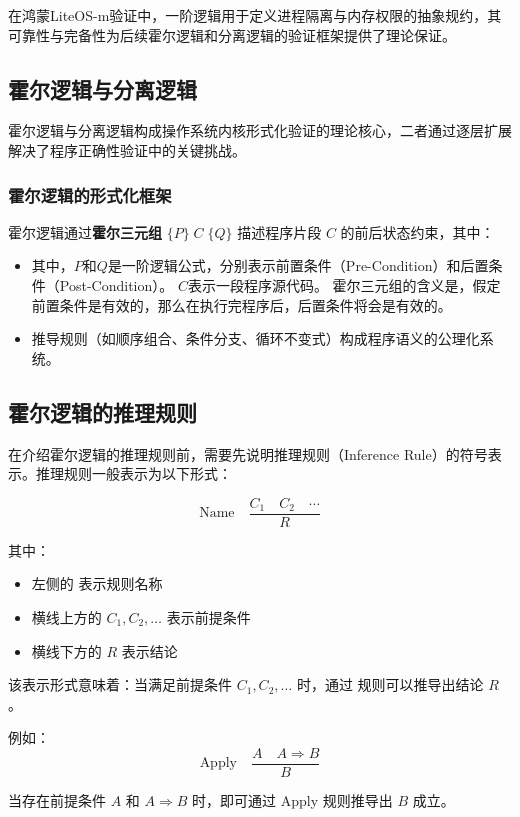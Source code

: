 在鸿蒙LiteOS-m验证中，一阶逻辑用于定义进程隔离与内存权限的抽象规约，其可靠性与完备性为后续霍尔逻辑和分离逻辑的验证框架提供了理论保证。

\subsection{霍尔逻辑与分离逻辑}
\label{subsec:hoare-separation}

霍尔逻辑与分离逻辑构成操作系统内核形式化验证的理论核心，二者通过逐层扩展解决了程序正确性验证中的关键挑战。

\subsubsection{霍尔逻辑的形式化框架}
霍尔逻辑通过\textbf{霍尔三元组} $\{P\}\;C\;\{Q\}$ 描述程序片段 $C$ 的前后状态约束，其中：
\begin{itemize}
    \item 其中，$P$和$Q$是一阶逻辑公式，分别表示前置条件（Pre-Condition）和后置条件（Post-Condition）。 $C$表示一段程序源代码。 霍尔三元组的含义是，假定前置条件是有效的，那么在执行完程序后，后置条件将会是有效的。
    \item 推导规则（如顺序组合、条件分支、循环不变式）构成程序语义的公理化系统。
\end{itemize}
\subsection{霍尔逻辑的推理规则}
在介绍霍尔逻辑的推理规则前，需要先说明推理规则（Inference Rule）的符号表示。推理规则一般表示为以下形式：

$$
\text{Name} \quad \frac{C_1 \quad C_2 \quad \cdots}{R}
$$

其中：
\begin{itemize}
    \item 左侧的  表示规则名称
    \item 横线上方的 $C_1, C_2, \ldots$ 表示前提条件
    \item 横线下方的 $R$ 表示结论
\end{itemize}

该表示形式意味着：当满足前提条件 $C_1, C_2, \ldots$ 时，通过  规则可以推导出结论 $R$。

例如：
$$
\text{Apply} \quad \frac{A \quad A \Rightarrow B}{B}
$$

当存在前提条件 $A$ 和 $A \Rightarrow B$ 时，即可通过 Apply 规则推导出 $B$ 成立。

